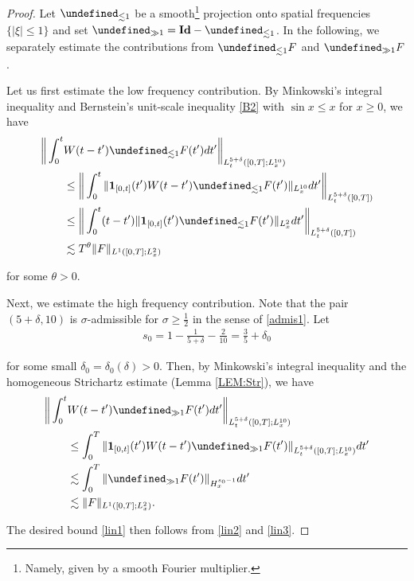\documentclass[letterpaper, 11pt,  reqno]{amsart}
\newcommand{\1}{\hspace{0.5mm}\text{I}\hspace{0.2mm}}
\newcommand{\noi}{\noindent}
\let\P= \undefined
\newcommand{\P}{\mathbf{P}}
\newcommand{\dl}{\delta}
\newcommand{\s}{\sigma}
\newcommand{\ta}{\theta}
\newcommand{\les}{\lesssim}
\newcommand{\ind}{\mathbf 1}
\newcommand{\Id}{\textup{\bf Id}}
\numberwithin{equation}{section}
\numberwithin{theorem}{section}
\begin{document}
\begin{proof}
Let $\P_{\les 1}$ be a smooth\footnote{Namely, given by 
a smooth Fourier multiplier.} projection onto 
spatial frequencies $\{|\xi|\leq 1\}$
and set $\P_{\gg 1} = \Id - \P_{\les 1}$.
In the following, we separately estimate the contributions
from $\P_{\les 1} F$ and $\P_{\gg 1}F$.

Let us first estimate the low frequency contribution.
By Minkowski's integral inequality and Bernstein's unit-scale inequality \eqref{B2}
with 
$\sin x \leq x$ for $x \geq 0$, we have
\begin{align}
\begin{split}
\bigg\|\int_0^t & W(t - t')   \P_{\les 1}F(t') dt'\bigg\|_{L^{5+\dl}_t([0, T];  L^{10}_x)}\\
&  \leq 
\bigg\|\int_0^t \|\ind_{[0, t]}(t') W(t - t')\P_{\les 1}F(t')\|_{L^{10}_x} 
dt'\bigg\|_{L^{5+\dl}_t([0, T])}\\
& \leq 
\bigg\|\int_0^t (t-t') \|\ind_{[0, t]}(t')\P_{\les 1}F(t')\|_{L^{2}_x} 
dt'\bigg\|_{L^{5+\dl}_t([0, T])}\\
& \les T^\ta \|F\|_{L^1([0, T]; L^2_x)}
\end{split}
\label{lin2}
\end{align}

\noi
for some $\ta > 0$.

Next, we estimate the high frequency contribution. 
Note that the pair $(5+\dl, 10)$ is $\s$-admissible for $\s \geq \frac 12$
in the sense of \eqref{admis1}. %
Let 
\begin{align}
s_0 = 1 - \frac{1}{5+\dl} - \frac{2}{10}
=   \frac{3}{5} +  \dl_0
\label{lin2a}
\end{align}

\noi
for some small $ \dl_0 = \dl_0(\dl)> 0$.
Then, 
by Minkowski's integral inequality
and the homogeneous Strichartz estimate (Lemma \ref{LEM:Str}), we have 
\begin{align}
\begin{split}
\bigg\|\int_0^t&  W(t - t')\P_{\gg1} F(t') dt'\bigg\|_{L^{5+\dl}_t([0, T];  L^{10}_x)}\\
&  \leq 
\int_0^T \|\ind_{[0, t]}(t') W(t - t')\P_{\gg 1}F(t')
\|_{L^{5+\dl}_t([0, T];  L^{10}_x)}
dt'\\
&  \les
\int_0^T \|\P_{\gg1} F(t')
\|_{H^{s_0-1}_x}
dt'\\
& 
\les \|F\|_{L^1([0, T]; L^2_x)}.
\end{split}
\label{lin3}
\end{align}


The desired bound \eqref{lin1} then follows from \eqref{lin2}
and \eqref{lin3}.
\end{proof}
	
\end{document}
